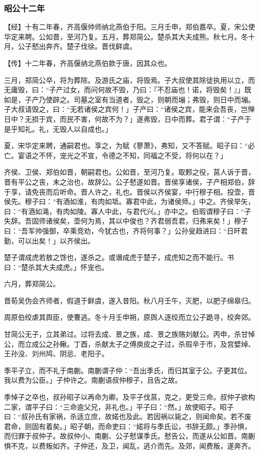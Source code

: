 \documentclass[]{article}
\begin{document}
\hypertarget{header-n2558}{%
\subsubsection{昭公十二年}\label{header-n2558}}

【经】十有二年春，齐高偃帅师纳北燕伯于阳。三月壬申，郑伯嘉卒。夏，宋公使华定来聘。公如晋，至河乃复。五月，葬郑简公。楚杀其大夫成熊。秋七月。冬十月，公子憖出奔齐。楚子伐徐。晋伐鲜虞。

【传】十二年春，齐高偃纳北燕伯款于唐，因其众也。

三月，郑简公卒，将为葬除。及游氏之庙，将毁焉。子大叔使其除徒执用以立，而无庸毁，曰：``子产过女，而问何故不毁，乃曰：『不忍庙也！诺，将毁矣！』」既如是，子产乃使辟之。司墓之室有当道者，毁之，则朝而塴；弗毁，则日中而塴。子大叔请毁之，曰：``无若诸侯之宾何！」子产曰：``诸侯之宾，能来会吾丧，岂惮日中？无损于宾，而民不害，何故不为？」遂弗毁，日中而葬。君子谓：``子产于是乎知礼。礼，无毁人以自成也。」

夏，宋华定来聘，通嗣君也。享之，为赋《蓼萧》，弗知，又不答赋。昭子曰：``必亡。宴语之不怀，宠光之不宣，令德之不知，同福之不受，将何以在？」

齐侯、卫侯、郑伯如晋，朝嗣君也。公如晋，至河乃复。取郠之役，莒人诉于晋，晋有平公之丧，未之治也，故辞公。公子憖遂如晋。晋侯享诸侯，子产相郑伯，辞于享，请免丧而后听命。晋人许之，礼也。晋侯以齐侯宴，中行穆子相。投壶，晋侯先。穆子曰：``有酒如淮，有肉如坻。寡君中此，为诸侯师。」中之。齐侯举矢，曰：``有酒如渑，有肉如陵。寡人中此，与君代兴。」亦中之。伯瑕谓穆子曰：``子失辞。吾固师诸侯矣，壶何为焉，其以中俊也？齐君弱吾君，归弗来矣！」穆子曰：``吾军帅强御，卒乘竞劝，今犹古也，齐将何事？」公孙叟趋进曰：``日旰君勤，可以出矣！」以齐侯出。

楚子谓成虎若敖之馀也，遂杀之。或谮成虎于楚子，成虎知之而不能行。书曰：``楚杀其大夫成虎。」怀宠也。

六月，葬郑简公。

晋荀吴伪会齐师者，假道于鲜虞，遂入昔阳。秋八月壬午，灭肥，以肥子绵皋归。

周原伯绞虐其舆臣，使曹逃。冬十月壬申朔，原舆人逐绞而立公子跪寻，绞奔郊。

甘简公无子，立其弟过。过将去成、景之族，成、景之族赂刘献公。丙申，杀甘悼公，而立成公之孙鳅。丁酉，杀献太子之傅庾皮之子过，杀瑕辛于市，及宫嬖绰、王孙没、刘州鸠、阴忌、老阳子。

季平子立，而不礼于南蒯。南蒯谓子仲：``吾出季氏，而归其室于公。子更其位。我以费为公臣。」子仲许之。南蒯语叔仲穆子，且告之故。

季悼子之卒也，叔孙昭子以再命为卿。及平子伐莒，克之，更受三命。叔仲子欲构二家，谓平子曰：``三命逾父兄，非礼也。」平子曰：``然。」故使昭子。昭子曰：``叔孙氏有家祸，杀适立庶，故婼也及此。若因祸以毙之，则闻命矣。若不废君命，则固有着矣。」昭子朝，而命吏曰：``婼将与季氏讼，书辞无颇。」季孙惧，而归罪于叔仲子。故叔仲小、南蒯、公子憖谋季氏。憖告公，而遂从公如晋。南蒯惧不克，以费叛如齐。子仲还，及卫，闻乱，逃介而先。及郊，闻费叛，遂奔齐。
\end{document}
